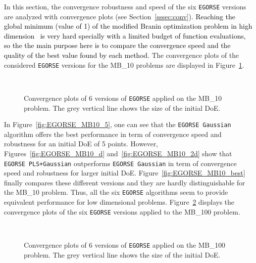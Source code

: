 In this section, the convergence robustness and speed of the six \texttt{EGORSE} versions are analyzed with convergence plots (see Section~\ref{sssec:conv}). {\textcolor{black}{Reaching the global minimum (value of 1) of the modified Branin optimization problem in high dimension~\cite{ParrInfillsamplingcriteria2012}  is very hard specially with a limited budget of function evaluations, so the the main purpose here is to compare the convergence speed and the quality of the best value found by  each method.}} 
The convergence plots of the considered \texttt{EGORSE} versions for the MB\_10 problems are displayed in Figure~\ref{fig:EGORSE_MB10}.
\begin{figure}[!htbp]
    \centering
     \\
    \caption{Convergence plots of 6 versions of \texttt{EGORSE} applied on the MB\_10 problem. The grey vertical line shows the size of the initial DoE.}
    \label{fig:EGORSE_MB10}
\end{figure}
In Figure~\ref{fig:EGORSE_MB10_5}, one can see that the \texttt{EGORSE Gaussian} algorithm offers the best performance in term of convergence speed and robustness for an initial DoE of 5 points. 
However, Figures~\ref{fig:EGORSE_MB10_d} and~\ref{fig:EGORSE_MB10_2d} show that \texttt{EGORSE PLS+Gaussian} outperforms \texttt{EGORSE Gaussian} in term of convergence speed and robustness for larger initial DoE. 
Figure~\ref{fig:EGORSE_MB10_best} finally compares these different versions and they are hardly distinguishable for the MB\_10 problem. 
Thus, all the six \texttt{EGORSE} algorithms seem to provide equivalent performance for low dimensional problems.
Figure~\ref{fig:EGORSE_MB100} displays the convergence plots of the six \texttt{EGORSE} versions applied to the MB\_100 problem.
\begin{figure}[!htbp]
    \centering
     \\
    \caption{Convergence plots of 6 versions of \texttt{EGORSE} applied on the MB\_100 problem. The grey vertical line shows the size of the initial DoE.}
    \label{fig:EGORSE_MB100}
\end{figure}
